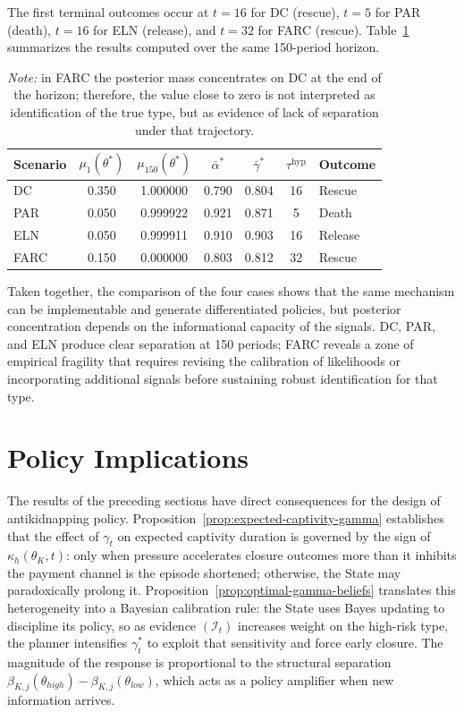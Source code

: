 \documentclass[12pt,a4paper]{article}
\theoremstyle{plain}
\theoremstyle{definition}
\theoremstyle{remark}
\newcommand{\1}{\mathbf{1}}
\begin{document}
The first terminal outcomes occur at $t=16$ for DC (rescue), $t=5$ for PAR (death),
$t=16$ for ELN (release), and $t=32$ for FARC (rescue). Table~\ref{tab:calibracion-cuatro}
summarizes the results computed over the same 150-period horizon.

\begin{table}[htbp]
\centering
\caption{Calibration summary for the four types, $t\leq150$}
\label{tab:calibracion-cuatro}
\begin{tabular}{lcccccl}
\toprule
Scenario & $\mu_1(\theta^\ast)$ & $\mu_{150}(\theta^\ast)$ & $\bar\alpha^\ast$ & $\bar\gamma^\ast$ & $\tau^{\mathrm{hyp}}$ & Outcome \\
\midrule
DC   & 0.350 & 1.000000 & 0.790 & 0.804 & 16 & Rescue \\
PAR  & 0.050 & 0.999922 & 0.921 & 0.871 & 5  & Death \\
ELN  & 0.050 & 0.999911 & 0.910 & 0.903 & 16 & Release \\
FARC & 0.150 & 0.000000 & 0.803 & 0.812 & 32 & Rescue \\
\bottomrule
\end{tabular}
\caption*{\footnotesize\textit{Note:} in FARC the posterior mass concentrates on DC at
the end of the horizon; therefore, the value close to zero is not interpreted as
identification of the true type, but as evidence of lack of separation under that
trajectory.}
\end{table}

Taken together, the comparison of the four cases shows that the same mechanism can be
implementable and generate differentiated policies, but posterior concentration depends
on the informational capacity of the signals. DC, PAR, and ELN produce clear separation
at 150 periods; FARC reveals a zone of empirical fragility that requires revising the
calibration of likelihoods or incorporating additional signals before sustaining robust
identification for that type.

\section{Policy Implications}
\label{sec:policy-implications}

The results of the preceding sections have direct consequences for the design of
antikidnapping policy. Proposition~\ref{prop:expected-captivity-gamma} establishes that
the effect of $\gamma_t$ on expected captivity duration is governed by the sign of
$\kappa_h(\theta_K,t)$: only when pressure accelerates closure outcomes more than it
inhibits the payment channel is the episode shortened; otherwise, the State may
paradoxically prolong it. Proposition~\ref{prop:optimal-gamma-beliefs} translates this
heterogeneity into a Bayesian calibration rule: the State uses Bayes updating to
discipline its policy, so as evidence $(\mathcal{I}_t)$ increases weight on the
high-risk type, the planner intensifies $\gamma_t^\ast$ to exploit that sensitivity and
force early closure. The magnitude of the response is proportional to the structural
separation $\beta_{K,j}(\theta_{high})-\beta_{K,j}(\theta_{low})$, which acts as a
policy amplifier when new information arrives.
\end{document}
